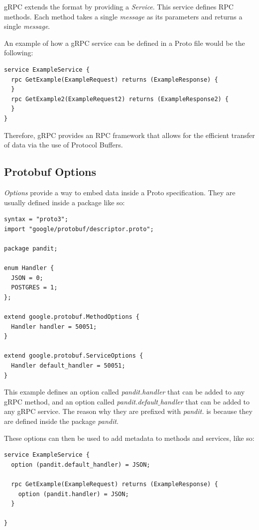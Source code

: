 \documentclass[a4paper,12pt]{report}
\begin{document}
gRPC extends the \textit{} format by providing a \textit{Service}. This service defines RPC methods. 
Each method takes a single \textit{message} as its parameters and returns a single \textit{message}.

An example of how a gRPC service can be defined in a Proto file would be the following:

\begin{lstlisting}
service ExampleService {
  rpc GetExample(ExampleRequest) returns (ExampleResponse) {
  }
  rpc GetExample2(ExampleRequest2) returns (ExampleResponse2) {
  }
}
\end{lstlisting}

Therefore, gRPC provides an RPC framework that allows for the efficient transfer of data via the use of Protocol Buffers.

\subsection{Protobuf Options}
\label{sec:options}
\textit{Options} provide a way to embed data inside a Proto specification. They are usually defined inside a package like so:
\begin{lstlisting}
syntax = "proto3";
import "google/protobuf/descriptor.proto";

package pandit;

enum Handler {
  JSON = 0;
  POSTGRES = 1;
};

extend google.protobuf.MethodOptions { 
  Handler handler = 50051; 
}

extend google.protobuf.ServiceOptions { 
  Handler default_handler = 50051; 
}
\end{lstlisting}

This example defines an option called \textit{pandit.handler} that can be added to any gRPC method, and an option called \textit{pandit.default$\_$handler} 
that can be added to any gRPC service. The reason why they are prefixed with \textit{pandit.} is because they are defined inside the package \textit{pandit}.

These options can then be used to add metadata to methods and services, like so:

\begin{lstlisting}
service ExampleService {
  option (pandit.default_handler) = JSON;

  rpc GetExample(ExampleRequest) returns (ExampleResponse) {
    option (pandit.handler) = JSON;
  }
  
}
\end{lstlisting}
\end{document}
